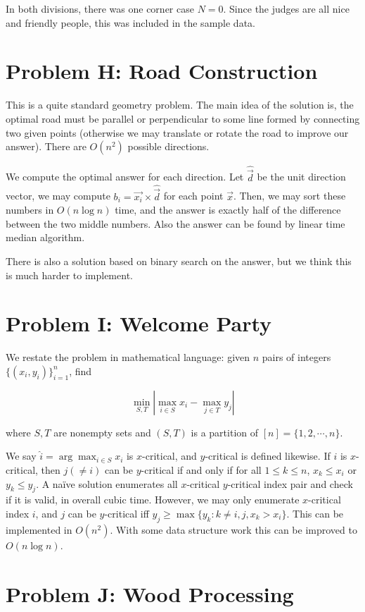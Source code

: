 \documentclass[a4paper,10.5pt,twoside]{article}
\begin{document}
In both divisions, there was one corner case $N = 0$. Since the judges are all nice and friendly people, this was included in the sample data.

\section*{Problem H: Road Construction}

This is a quite standard geometry problem. The main idea of the solution is, the optimal road must be parallel or perpendicular to some line formed by connecting two given points (otherwise we may translate or rotate the road to improve our answer). There are $O(n^2)$ possible directions.

We compute the optimal answer for each direction. Let $\hat{\vec{d}}$ be the unit direction vector, we may compute $b_i = \vec{x_i} \times \hat{\vec{d}}$ for each point $\vec{x}$. Then, we may sort these numbers in $O(n \log n)$ time, and the answer is exactly half of the difference between the two middle numbers. Also the answer can be found by linear time median algorithm.

There is also a solution based on binary search on the answer, but we think this is much harder to implement.

\section*{Problem I: Welcome Party}
 
We restate the problem in mathematical language: given $n$ pairs of integers $\{(x_i, y_i)\}_{i=1}^n$, find

$$ \min_{S, T} | \max_{i \in S} x_i - \max_{j \in T} y_j | $$

where $S, T$ are nonempty sets and $(S, T)$ is a partition of $[n] = \{1, 2, \cdots, n\}$.

We say $\hat{i} = \arg\max_{i \in S} x_i$ is $x$-critical, and $y$-critical is defined likewise. If $i$ is $x$-critical, then $j (\neq i)$ can be $y$-critical if and only if for all $1 \leq k \leq n$, $x_k \leq x_i$ or $y_k \leq y_j$. A na\"ive solution enumerates all $x$-critical $y$-critical index pair and check if it is valid, in overall cubic time. However, we may only enumerate $x$-critical index $i$, and $j$ can be $y$-critical iff $y_j \geq \max\{y_k : k \neq i, j, x_k > x_i\}$. This can be implemented in $O(n^2)$. With some data structure work this can be improved to $O(n \log n)$.

\section*{Problem J: Wood Processing}
\end{document}
